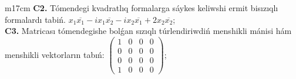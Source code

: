 \documentclass{article}
\begin{document}
\begin{tabular}{m{17cm}}
\textbf{C2.} Tómendegi kvadratlıq formalarga sáykes keliwshi ermit bisızıqlı formalardı tabiń. \(x_{1}\overline{x_{1}} - ix_{1}\overline{x_{2}} - ix_{2}\overline{x_{1}} + 2x_{2}\overline{x_{2}}\); \\
\textbf{C3.} Matricası tómendegishe bolǵan sızıqlı túrlendiriwdiń menshikli mánisi hám menshikli vektorların tabıń: \(\begin{pmatrix} 1 & 0 & 0 & 0 \\ 0 & 0 & 0 & 0 \\ 0 & 0 & 0 & 0 \\ 1 & 0 & 0 & 0 \end{pmatrix}\); \\

\end{tabular}
\vspace{1cm}
\end{document}
